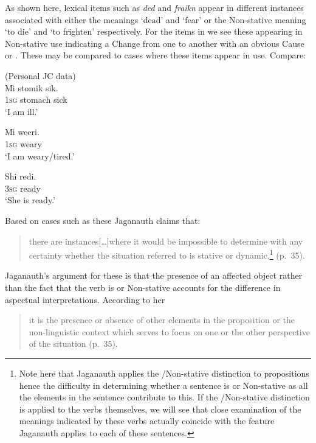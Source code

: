 As shown here, lexical items such as \textit{ded} and \textit{fraikn}
appear in different instances associated with either the 
meanings `dead' and `fear' or the Non-stative meaning `to die' and ‘to
frighten' respectively.  For the items in  we see these
appearing in Non-stative use indicating a Change from one  to
another with an obvious Cause or .  These may be compared to
cases where these items appear in  use.  Compare:

\ea%
\label{ex:2:14}
(Personal JC data)\\
\ea
    \gll Mi stomik sik.\\
\textsc{1sg} stomach sick\\
\glt  `I am ill.'

\ex
  \gll  Mi weeri.\\
\textsc{1sg} weary \\
\glt `I am weary/tired.'

\ex
   \gll Shi redi.\\
\textsc{3sg} ready\\
\glt `She is ready.'\z \z

Based on cases such as these Jaganauth claims that:

\begin{quote}
there are instances[…]where it would be impossible to determine with any
certainty whether the situation referred to is stative or
dynamic.\footnote{Note here that Jaganauth applies the
  \slash Non-stative distinction to propositions hence the
  difficulty in determining whether a sentence is  or
  Non-stative as all the elements in the sentence contribute to
  this. If the \slash Non-stative distinction is applied to the verbs
  themselves, we will see that close examination of the meanings
  indicated by these verbs actually coincide with the feature
  Jaganauth applies to each of these sentences.}  (p.~35).
\end{quote}

Jaganauth’s argument for these is that the presence of an affected
object rather than the fact that the verb is  or Non-stative
accounts for the difference in aspectual interpretations.  According
to her

\begin{quote}
it is the presence or absence of other elements in the proposition or
the non-linguistic context which serves to focus on one or the other
perspective of the situation (p.~35).
\end{quote}


